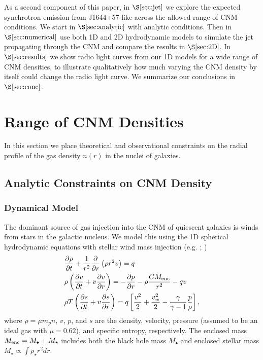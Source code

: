 \documentclass[usenatbib,fleqn]{mnras}
\newcommand{\Menc}{M_{\rm enc}}
\begin{document}
As a second component of this paper, in $\S\ref{sec:jet}$ we
explore the expected synchrotron emission from J1644+57-like across
the allowed range of CNM conditions.  We start in
$\S\ref{sec:analytic}$ with analytic conditions.  Then in
$\S\ref{sec:numerical}$ use both 1D and 2D hydrodynamic models to
simulate the jet propagating through the CNM and compare the results
in $\S\ref{sec:2D}$. In $\S\ref{sec:results}$ we show radio
light curves from our 1D models for a wide range of CNM densities, to
illustrate qualitatively how much varying the CNM density by itself
could change the radio light curve.  We summarize our conclusions in
$\S\ref{sec:conc}$.

\section{Range of CNM Densities}
\label{sec:cnm}

In this section we place theoretical and observational constraints on
the radial profile of the gas density $n(r)$ in the nuclei of
galaxies. 

\subsection{Analytic Constraints on CNM Density}

\subsubsection{Dynamical Model}
\label{sec:model}

The dominant source of gas injection into the CNM of quiescent
galaxies is winds from stars in the galactic nucleus. We model this
using the 1D spherical hydrodynamic equations with stellar wind mass
injection (e.g. \citealt{Holzer+1970}; \citealt{Quataert2004})
\begin{align}
  &\frac{\partial \rho}{\partial t}+\frac{1}{r^2}\frac{\partial}{\partial r}\left(\rho r^2 v\right)=q \label{eq:drhodt}\\
  &\rho \left(\frac{\partial v}{\partial t} + v\frac{\partial
      v}{\partial r}\right) =-\frac{\partial p}{\partial r}- \rho\frac{GM_{\rm enc}}{r^{2}} -q v \label{eq:dvdt}\\
  &\rho T\left(\frac{\partial s}{\partial t} + v\frac{\partial
      s}{\partial
      r}\right)=q\left[\frac{v^2}{2}+\frac{v_w^2}{2}-\frac{\gamma}{\gamma-1}
    \frac{p}{\rho} \right] ,
\label{eq:model}
\end{align}
where $\rho = \mu m_p n$, $v$, $p$, and $s$ are the density, velocity,
pressure (assumed to be an ideal gas with $\mu = 0.62$), and specific
entropy, respectively.  The enclosed mass $\Menc = M_{\bullet} +
M_{\star}$ includes both the black hole mass $M_{\bullet}$ and
enclosed stellar mass $M_{\star} \propto \int \rho_{\star}r^{2}dr$. 
\end{document}
